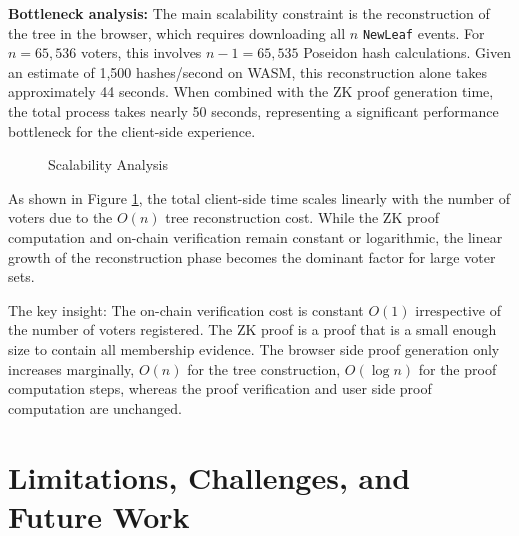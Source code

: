 \documentclass[12pt, a4paper]{report}
\begin{document}
\textbf{Bottleneck analysis:} The main scalability constraint is the reconstruction of the tree in the browser, which requires downloading all $n$ \texttt{NewLeaf} events. For $n = 65{,}536$ voters, this involves $n - 1 = 65{,}535$ Poseidon hash calculations. Given an estimate of 1,500 hashes/second on WASM, this reconstruction alone takes approximately 44 seconds. When combined with the ZK proof generation time, the total process takes nearly 50 seconds, representing a significant performance bottleneck for the client-side experience.

\begin{figure}[H]
	\centering
	\caption{Scalability Analysis}
	\label{fig:scalability}
\end{figure}

As shown in Figure \ref{fig:scalability}, the total client-side time scales linearly with the number of voters due to the $O(n)$ tree reconstruction cost. While the ZK proof computation and on-chain verification remain constant or logarithmic, the linear growth of the reconstruction phase becomes the dominant factor for large voter sets.


The key insight: The on-chain verification cost is constant $O(1)$ irrespective of the number of voters registered. The ZK proof is a proof that is a small enough size to contain all membership evidence. The browser side proof generation only increases marginally, $O(n)$ for the tree construction, $O(\log n)$ for the proof computation steps, whereas the proof verification and user side proof computation are unchanged.

\newpage
\section{Limitations, Challenges, and Future Work}
\end{document}
